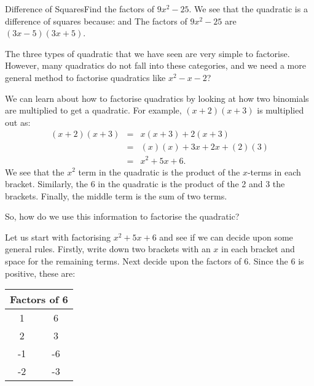 \documentclass[10pt,a4paper,titlepage,twoside,openright]{report}
\begin{document}
\begin{wex}{Difference of Squares}{Find the factors of $9x^2-25$.}{
We see that the quadratic is a difference of squares because:
and
The factors of $9x^2-25$ are $(3x-5)(3x+5)$.}
\end{wex}

The three types of quadratic that we have seen are very simple to factorise. However, many quadratics do not fall into these categories, and we need a more general method to factorise quadratics like $x^2-x-2$?

We can learn about how to factorise quadratics by looking at how two binomials are multiplied to get a quadratic. For example, $(x+2)(x+3)$ is multiplied out as:
\begin{eqnarray*}
(x+2)(x+3)&=&x(x+3)+2(x+3)\\
&=&(x)(x) +3x +2x +(2)(3)\\
&=&x^2 +5x +6.
\end{eqnarray*}
We see that the $x^2$ term in the quadratic is the product of the $x$-terms in each bracket. Similarly, the 6 in the quadratic is the product of the 2 and 3 the brackets. Finally, the middle term is the sum of two terms.

So, how do we use this information to factorise the quadratic?




Let us start with factorising $x^2 +5x +6$ and see if we can decide upon some general rules. Firstly, write down two brackets with an $x$ in each bracket and space for the remaining terms.
Next decide upon the factors of 6. Since the 6 is positive, these are:
\begin{center}
\begin{tabular}{|c|c|}\hline\hline
\multicolumn{2}{|c|}{Factors of 6}\\\hline\hline
1&6\\\hline
2&3\\\hline
-1&-6\\\hline
-2&-3\\\hline
\end{tabular}
\end{center}
\end{document}
